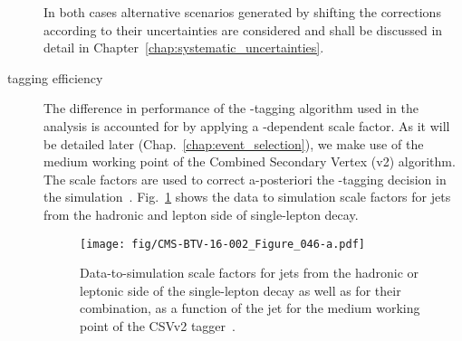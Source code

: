 \begin{description}
In both cases alternative scenarios generated by shifting the corrections according to their uncertainties are considered and shall be discussed in detail in Chapter~\ref{chap:systematic_uncertainties}.

\item[\cPqb tagging efficiency]

The difference in performance of the \cPqb-tagging algorithm used in the analysis is accounted for by applying a \pt-dependent scale factor. As it will be detailed later (Chap.~\ref{chap:event_selection}), we make use of the medium working point of the Combined Secondary Vertex (v2) algorithm. The scale factors are used to correct a-posteriori the \cPqb-tagging decision in the simulation~\cite{twiki:BTV}. Fig.~\ref{fig:btag_sf} shows the data to simulation scale factors for \cPqb jets from the hadronic and lepton side of single-lepton \ttbar decay.

\begin{figure}[htp]
\centering
  \def\twidth{0.45}
  \centering
    \texttt{[image: fig/CMS-BTV-16-002\_Figure\_046-a.pdf]}
\caption{Data-to-simulation scale factors for \cPqb jets from the hadronic or leptonic side of the single-lepton \ttbar decay as well as for their combination, as a function of the jet \pt for the medium working point of the CSVv2 tagger~\cite{Sirunyan:2017ezt}.}
\label{fig:btag_sf}
\end{figure}

\end{description}

